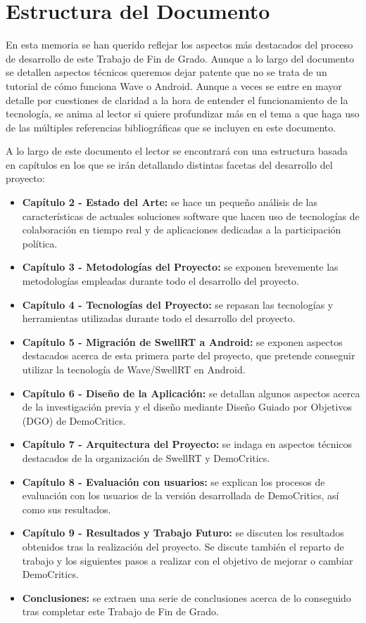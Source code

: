 \section{Estructura del Documento}

En esta memoria se han querido reflejar los aspectos más destacados del proceso de desarrollo de este Trabajo de Fin de Grado. Aunque a lo largo del documento se detallen aspectos técnicos queremos dejar patente que no se trata de un tutorial de cómo funciona Wave o Android. Aunque a veces se entre en mayor detalle por cuestiones de claridad a la hora de entender el funcionamiento de la tecnología, se anima al lector si quiere profundizar más en el tema a que haga uso de las múltiples referencias bibliográficas que se incluyen en este documento.  

A lo largo de este documento el lector se encontrará con una estructura basada en capítulos en los que se irán detallando distintas facetas del desarrollo del proyecto: 

\begin{itemize}
  \item \textbf{Capítulo 2 - Estado del Arte:} se hace un pequeño análisis de las características de actuales soluciones software que hacen uso de tecnologías de colaboración en tiempo real y de aplicaciones dedicadas a la participación política.
  \item \textbf{Capítulo 3 - Metodologías del Proyecto:} se exponen brevemente las metodologías empleadas durante todo el desarrollo del proyecto.
  \item \textbf{Capítulo 4 - Tecnologías del Proyecto:} se repasan las tecnologías y herramientas utilizadas durante todo el desarrollo del proyecto.
  \item \textbf{Capítulo 5 - Migración de SwellRT a Android:} se exponen aspectos destacados acerca de esta primera parte del proyecto, que pretende conseguir utilizar la tecnología de Wave/SwellRT en Android.
    \item \textbf{Capítulo 6 - Diseño de la Aplicación:} se detallan algunos aspectos acerca de la investigación previa y el diseño mediante Diseño Guiado por Objetivos (DGO) de DemoCritics.
  \item \textbf{Capítulo 7 - Arquitectura del Proyecto:} se indaga en aspectos técnicos destacados de la organización de SwellRT y DemoCritics.
    \item \textbf{Capítulo 8 - Evaluación con usuarios:} se explican los procesos de evaluación con los usuarios de la versión desarrollada de DemoCritics, así como sus resultados.
  \item \textbf{Capítulo 9 - Resultados y Trabajo Futuro:} se discuten los resultados obtenidos tras la realización del proyecto. Se discute también el reparto de trabajo y los siguientes pasos a realizar con el objetivo  de mejorar o cambiar DemoCritics.
    \item \textbf{Conclusiones:} se extraen una serie de conclusiones acerca de lo conseguido tras completar este Trabajo de Fin de Grado.
\end{itemize}
